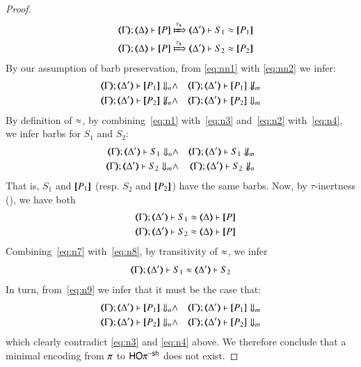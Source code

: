\documentclass[preprint,11pt]{elsarticle}
\begin{document}
{\begin{proof}
\begin{eqnarray}
		& & \horel{\mapt{\Gamma}}{\mapt{\Delta}}{\map{P}}{\Hby{\stau}}{\mapt{\Delta'}}{S_1 \WB \map{P_1}} \label{eq:n1} \\
		& & \horel{\mapt{\Gamma}}{\mapt{\Delta}}{\map{P}}{\Hby{\stau}}{\mapt{\Delta'}}{S_2 \WB \map{P_2}} \label{eq:n2}
	\end{eqnarray}
	By our assumption of barb preservation, 
	from \eqref{eq:nn1} with \eqref{eq:nn2}
	we infer: 
	\begin{eqnarray}
		\mapt{\Gamma}; \mapt{\Delta'} \proves \map{P_1} \Barb{n} & \land & 
		\mapt{\Gamma}; \mapt{\Delta'} \proves \map{P_1} \nBarb{m} \label{eq:n3} \\
		\mapt{\Gamma}; \mapt{\Delta'} \proves \map{P_2} \nBarb{n}   & \land & 
		\mapt{\Gamma}; \mapt{\Delta'} \proves \map{P_2} \Barb{m} \label{eq:n4}
	\end{eqnarray}
	By definition of $\approx$, 
	by combining~\eqref{eq:n1} with~\eqref{eq:n3}
	and~\eqref{eq:n2} with~\eqref{eq:n4}, we infer barbs for $S_1$ and $S_2$:
	\begin{eqnarray}
		\mapt{\Gamma}; \mapt{\Delta'} \proves S_1 \Barb{n} & \land & 
		\mapt{\Gamma}; \mapt{\Delta'} \proves S_1 \nBarb{m} \label{eq:n5} \\
		\mapt{\Gamma}; \mapt{\Delta'} \proves S_2 \Barb{m} & \land & 
		\mapt{\Gamma}; \mapt{\Delta'} \proves S_2 \nBarb{n} \label{eq:n6}
	\end{eqnarray}
	That is, $S_1$ and $[\!\![P_1]\!\!]$ 
	(resp. $S_2$ and $[\!\![P_2]\!\!]$)
	have the same barbs.
	Now, by $\tau$-inertness (), we have both 
	\begin{eqnarray}
		& & \horel{\mapt{\Gamma}}{\mapt{\Delta'}}{S_1}{\WB}{\mapt{\Delta}}{\map{P}} \label{eq:n7} \\
		& & \horel{\mapt{\Gamma}}{\mapt{\Delta'}}{S_2}{\WB}{\mapt{\Delta}}{\map{P}} \label{eq:n8}
	\end{eqnarray}
	Combining~\eqref{eq:n7} with~\eqref{eq:n8}, by transitivity of $\approx$,
	we infer
	\begin{equation}
		\horel{\mapt{\Gamma}}{\mapt{\Delta'}}{S_1}{\WB}{\mapt{\Delta'}}{S_2} \label{eq:n9}
	\end{equation}
	In turn, from~\eqref{eq:n9}
	we infer that 
	it must be the case that:
	\begin{eqnarray*}
		\mapt{\Gamma}; \mapt{\Delta'} \proves \map{P_1} \Barb{n} & \land & 
		\mapt{\Gamma}; \mapt{\Delta'} \proves \map{P_1} \Barb{m} \label{eq:n10} \\
		\mapt{\Gamma}; \mapt{\Delta'} \proves \map{P_2} \Barb{n}  & \land & 
		 \mapt{\Gamma}; \mapt{\Delta'} \proves \map{P_2} \Barb{m} \label{eq:n11}
	\end{eqnarray*}
	which clearly contradict \eqref{eq:n3} and \eqref{eq:n4} above. 
	We therefore conclude that a minimal encoding from $\pi$ to $\mathsf{HO}\pi^{\mathsf{-sh}}$ does not exist.
\end{proof}

}
\end{document}
